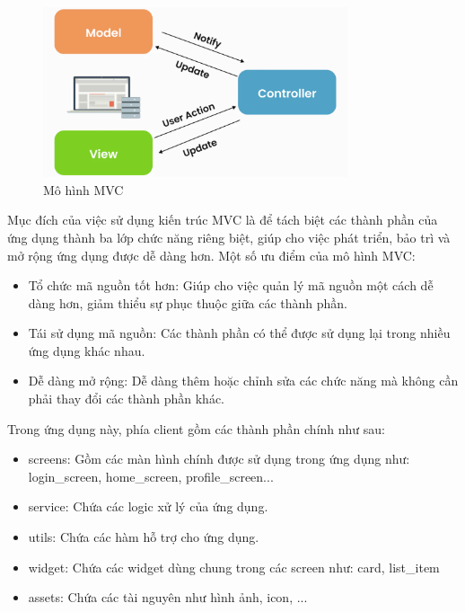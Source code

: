 \documentclass[../DoAn.tex]{subfiles}
\begin{document}
\begin{figure}[H]
    \centering
    \includegraphics[width=0.8\textwidth]{Hinhve/Mo-hinh-mvc.png}
    \caption{Mô hình MVC}
    \label{fig:Mo-hinh-mvc}
\end{figure}

Mục đích của việc sử dụng kiến trúc MVC là để tách biệt các thành phần của 
ứng dụng thành ba lớp chức năng riêng biệt, giúp cho việc phát triển, bảo trì 
và mở rộng ứng dụng được dễ dàng hơn.
Một số ưu điểm của mô hình MVC:
\begin{itemize}
  \item Tổ chức mã nguồn tốt hơn: Giúp cho việc quản lý mã nguồn một cách dễ 
  dàng hơn, giảm thiểu sự phục thuộc giữa các thành phần.
  \item Tái sử dụng mã nguồn: Các thành phần có thể được sử dụng lại trong nhiều 
  ứng dụng khác nhau.
  \item Dễ dàng mở rộng: Dễ dàng thêm hoặc chỉnh sửa các chức năng mà không cần 
  phải thay đổi các thành phần khác.
\end{itemize}

Trong ứng dụng này, phía client gồm các thành phần chính như sau:
\begin{itemize}
    \item screens: Gồm các màn hình chính được sử dụng trong ứng dụng như: login\_screen, home\_screen, profile\_screen...
    \item service: Chứa các logic xử lý của ứng dụng.
    \item utils: Chứa các hàm hỗ trợ cho ứng dụng.
    \item widget: Chứa các widget dùng chung trong các screen như: card, list\_item
    \item assets: Chứa các tài nguyên như hình ảnh, icon, ...
\end{itemize}
\end{document}
